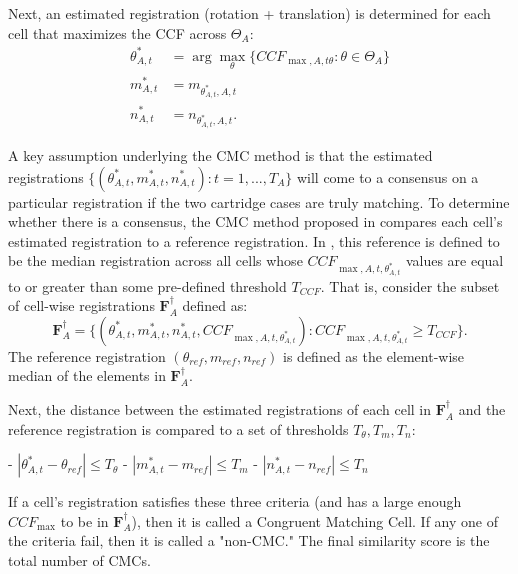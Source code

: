 \documentclass[reprint]{JASA}
\begin{document}
\begin{appendices}
Next, an estimated registration (rotation + translation) is determined for each cell that maximizes the CCF across $\Theta_A$:
\begin{align*}
\theta_{A,t}^* &= \arg \max_{\theta} \{CCF_{\max,A,t\theta} : \theta \in \Theta_A\} \\
m_{A,t}^* &= m_{\theta_{A,t}^*,A,t} \\
n_{A,t}^* &= n_{\theta_{A,t}^*,A,t}.
\end{align*}

A key assumption underlying the CMC method is that the estimated registrations $\{(\theta_{A,t}^*, m_{A,t}^*, n_{A,t}^*) : t = 1,...,T_A\}$ will come to a consensus on a particular registration if the two cartridge cases are truly matching.
To determine whether there is a consensus, the CMC method proposed in \citet{song_proposed_2013} compares each cell's estimated registration to a reference registration.
In \citet{song_proposed_2013}, this reference is defined to be the median registration across all cells whose $CCF_{\max,A,t,\theta_{A,t}^*}$ values are equal to or greater than some pre-defined threshold $T_{CCF}$.
That is, consider the subset of cell-wise registrations $\pmb{F}^\dagger_A$ defined as:
$$
\pmb{F}^\dagger_A = \{(\theta_{A,t}^*, m_{A,t}^*, n_{A,t}^*,CCF_{\max,A,t,\theta_{A,t}^*}) : CCF_{\max,A,t,\theta_{A,t}^*} \geq T_{CCF}\}.
$$
The reference registration $(\theta_{ref}, m_{ref}, n_{ref})$ is defined as the element-wise median of the elements in $\pmb{F}_A^\dagger$.

Next, the distance between the estimated registrations of each cell in $\pmb{F}_A^\dagger$ and the reference registration is compared to a set of thresholds $T_\theta, T_{m}, T_{n}$:

- $|\theta_{A,t}^* - \theta_{ref}| \leq T_\theta$
- $|m_{A,t}^* - m_{ref}| \leq T_m$
- $|n_{A,t}^* - n_{ref}| \leq T_n$

If a cell's registration satisfies these three criteria (and has a large enough $CCF_{\max}$ to be in $\pmb{F}_A^\dagger$), then it is called a Congruent Matching Cell.
If any one of the criteria fail, then it is called a "non-CMC."
The final similarity score is the total number of CMCs.



\end{appendices}


\end{document}
